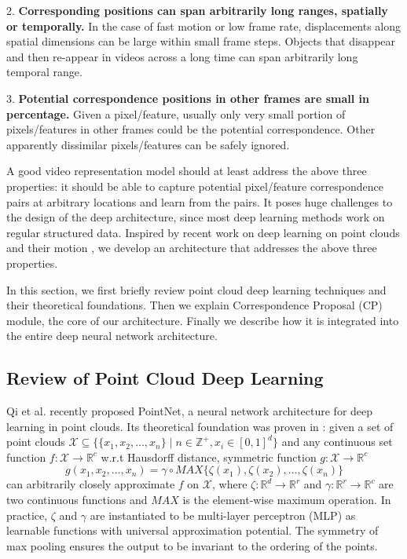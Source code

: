 \documentclass[10pt,twocolumn,letterpaper]{article}
\begin{document}
2. \textbf{Corresponding positions can span arbitrarily long ranges, spatially or temporally.} In the case of fast motion or low frame rate, displacements along spatial dimensions can be large within small frame steps. Objects that disappear and then re-appear in videos across a long time can span arbitrarily long temporal range. 

3. \textbf{Potential correspondence positions in other frames are small in percentage.} 
Given a pixel/feature, usually only very small portion of pixels/features in other frames could be the potential correspondence. 
Other apparently dissimilar pixels/features can be safely ignored. 



A good video representation model should at least address the above three properties: it should be able to capture potential pixel/feature correspondence pairs at arbitrary locations and learn from the pairs. It poses huge challenges to the design of the deep architecture, since most deep learning methods work on regular structured data. Inspired by recent work on deep learning on point clouds \cite{PointNet,PointNet++,Dynamic:Graph:CNN} and their motion \cite{FlowNet3D}, we develop an architecture that addresses the above three properties. 

In this section, we first briefly review point cloud deep learning techniques and their theoretical foundations. Then we explain Correspondence Proposal (CP) module, the core of our architecture. Finally we describe how it is integrated into the entire deep neural network architecture. 



\subsection{Review of Point Cloud Deep Learning}

Qi et al. \cite{PointNet} recently proposed PointNet, a neural network architecture for deep learning in point clouds. 
Its theoretical foundation was proven in \cite{PointNet}: given 
a set of point clouds $\mathcal{X} \subseteq \{ \{x_1,x_2,\ldots, x_n\} \mid n \in \mathbb{Z}^+,  x_i \in [0,1]^d\}$
and any continuous set function  $f : \mathcal{X} \rightarrow \mathbb{R}^c$ w.r.t Hausdorff distance, symmetric function $g : \mathcal{X} \rightarrow \mathbb{R}^c$    
$$
g(x_1,x_2,\ldots,x_n) = \gamma \circ MAX \{\zeta(x_1), \zeta(x_2), \ldots, \zeta(x_n) \}
$$
can arbitrarily closely approximate $f$ on $\mathcal{X}$, where  $\zeta: \mathbb{R}^d\rightarrow\mathbb{R}^r$ and $\gamma: \mathbb{R}^r\rightarrow \mathbb{R}^c$ are two continuous functions and $MAX$ is the element-wise maximum operation. In practice, $\zeta$ and $\gamma$ are instantiated to be multi-layer perceptron (MLP) as learnable functions with universal approximation potential. The symmetry of max pooling ensures the output to be invariant to the ordering of the points.
\end{document}
